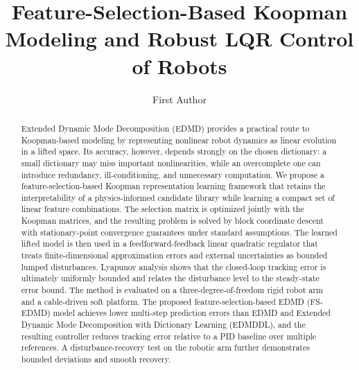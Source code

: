 \documentclass[a4paper,fleqn]{cas-dc}
\begin{document}
\let\WriteBookmarks\relax
\def\floatpagepagefraction{1}
\def\textpagefraction{.001}

\makeatletter
{}
\AtBeginDocument{\gdef\lastpage{\@abspage@last}}
\makeatother


\title[mode=title]{Feature-Selection-Based Koopman Modeling and Robust LQR Control of Robots}

\author[1]{First Author}
\cormark[1]



\begin{abstract}
Extended Dynamic Mode Decomposition (EDMD) provides a practical route to Koopman-based modeling by representing nonlinear robot dynamics as linear evolution in a lifted space. Its accuracy, however, depends strongly on the chosen dictionary: a small dictionary may miss important nonlinearities, while an overcomplete one can introduce redundancy, ill-conditioning, and unnecessary computation. We propose a feature-selection-based Koopman representation learning framework that retains the interpretability of a physics-informed candidate library while learning a compact set of linear feature combinations. The selection matrix is optimized jointly with the Koopman matrices, and the resulting problem is solved by block coordinate descent with stationary-point convergence guarantees under standard assumptions. The learned lifted model is then used in a feedforward-feedback linear quadratic regulator that treats finite-dimensional approximation errors and external uncertainties as bounded lumped disturbances. Lyapunov analysis shows that the closed-loop tracking error is ultimately uniformly bounded and relates the disturbance level to the steady-state error bound. The method is evaluated on a three-degree-of-freedom rigid robot arm and a cable-driven soft platform. The proposed feature-selection-based EDMD (FS-EDMD) model achieves lower multi-step prediction errors than EDMD and Extended Dynamic Mode Decomposition with Dictionary Learning (EDMDDL), and the resulting controller reduces tracking error relative to a PID baseline over multiple references. A disturbance-recovery test on the robotic arm further demonstrates bounded deviations and smooth recovery.
\end{abstract}
\end{document}
